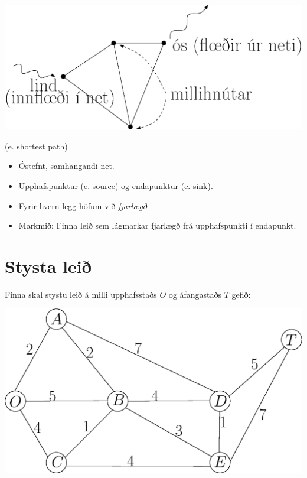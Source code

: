 \begin{description}
 \begin{center} \includegraphics[width=0.6\columnwidth]{figs/flownet.eps}\end{center}
\item{ (e. shortest path)}
\begin{itemize}
\item Óstefnt, samhangandi net.
\item Upphafspunktur (e. source) og endapunktur (e. sink).
\item Fyrir hvern legg höfum við \emph{fjarlægð} 
\item Markmið: Finna leið sem lágmarkar fjarlægð frá upphafspunkti í endapunkt.
\end{itemize}
\end{description}

\section{Stysta leið}
\begin{daemi}\label{daemi:seervada}Finna skal stystu leið á milli upphafsstaðs $O$ og áfangastaðs $T$ gefið:
\begin{center}
  \includegraphics[width=0.7\columnwidth]{figs/seervada.eps}
\end{center}
\end{daemi}

